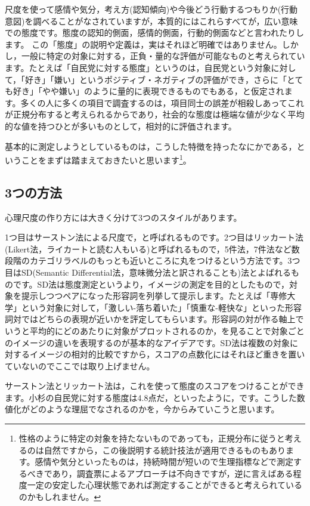 \documentclass{ltjsbook}
\begin{document}
尺度を使って感情や気分，考え方(認知傾向)や今後どう行動するつもりか(行動意図)を調べることがなされていますが，本質的にはこれらすべてが，広い意味での態度です。態度の認知的側面，感情的側面，行動的側面などと言われたりします\parencite{Fujihara2001}。
この「態度」の説明や定義は，実はそれほど明確ではありません。しかし，一般に特定の対象に対する，正負・量的な評価が可能なものと考えられています。たとえば「自民党に対する態度」というのは，自民党という対象に対して，「好き」「嫌い」というポジティブ・ネガティブの評価ができ，さらに「とても好き」「やや嫌い」のように量的に表現できるものでもある，と仮定されます。多くの人に多くの項目で調査するのは，項目同士の誤差が相殺しあってこれが正規分布すると考えられるからであり，社会的な態度は極端な値が少なく平均的な値を持つひとが多いものとして，相対的に評価されます。

基本的に測定しようとしているものは，こうした特徴を持ったなにかである，ということをまずは踏まえておきたいと思います\footnote{性格のように特定の対象を持たないものであっても，正規分布に従うと考えるのは自然ですから，この後説明する統計技法が適用できるものもあります。感情や気分といったものは，持続時間が短いので生理指標などで測定するべきであり，調査票によるアプローチは不向きですが，逆に言えばある程度一定の安定した心理状態であれば測定することができると考えられているのかもしれません。}。

\subsection{3つの方法}
心理尺度の作り方には大きく分けて3つのスタイルがあります。

1つ目はサーストン法による尺度で，と呼ばれるものです。2つ目はリッカート法(Likert法，ライカートと読む人もいる)と呼ばれるもので，5件法，7件法など数段階のカテゴリラベルのもっとも近いところに丸をつけるという方法です。3つ目はSD(Semantic Differential法，意味微分法と訳されることも)法とよばれるものです。SD法は態度測定というより，イメージの測定を目的としたもので，対象を提示しつつペアになった形容詞を列挙して提示します。たとえば「専修大学」という対象に対して，「激しい-落ち着いた」「慎重な-軽快な」といった形容詞対ではどちらの表現が近いかを評定してもらいます。形容詞の対が作る軸上でいうと平均的にどのあたりに対象がプロットされるのか，を見ることで対象ごとのイメージの違いを表現するのが基本的なアイデアです。SD法は複数の対象に対するイメージの相対的比較ですから，スコアの点数化にはそれほど重きを置いていないのでここでは取り上げません。

サーストン法とリッカート法は，これを使って態度のスコアをつけることができます。小杉の自民党に対する態度は4.8点だ，といったように，です。こうした数値化がどのような理屈でなされるのかを，今からみていこうと思います。
\end{document}
